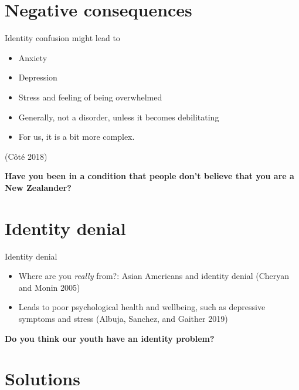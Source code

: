 \documentclass[
  ignorenonframetext,
  aspectratio=169,
]{beamer}
\providecommand{\tightlist}{%
  \setlength{\itemsep}{0pt}\setlength{\parskip}{0pt}}\usepackage{longtable,booktabs,array}
\begin{document}
\section{Negative consequences}\label{negative-consequences}

\begin{frame}{Identity confusion might lead to}
\label{identity-confusion-might-lead-to}
\begin{itemize}
\tightlist
\item
  Anxiety
\item
  Depression
\item
  Stress and feeling of being overwhelmed
\item
  Generally, not a disorder, unless it becomes debilitating
\item
  For us, it is a bit more complex.
\end{itemize}

(Côté 2018)
\end{frame}

\begin{frame}
\textbf{Have you been in a condition that people don't believe that you
are a New Zealander?}
\end{frame}

\section{Identity denial}\label{identity-denial}

\begin{frame}{Identity denial}
\label{identity-denial-1}
\begin{itemize}[<+->]
\tightlist
\item
  Where are you \emph{really} from?: Asian Americans and identity denial
  (Cheryan and Monin 2005)
\item
  Leads to poor psychological health and wellbeing, such as depressive
  symptoms and stress (Albuja, Sanchez, and Gaither 2019)
\end{itemize}
\end{frame}

\begin{frame}
\textbf{Do you think our youth have an identity problem?}
\end{frame}

\section{Solutions}\label{solutions}
\end{document}
